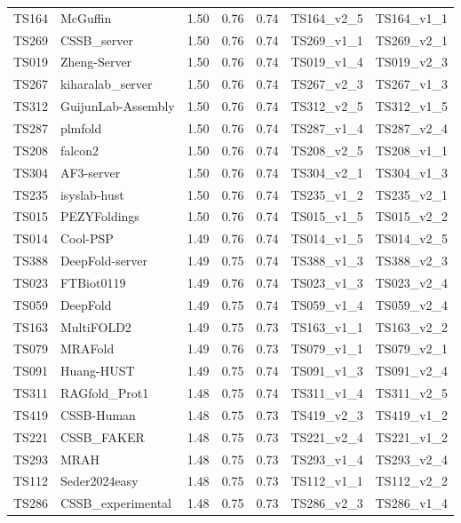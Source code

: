 \begin{longtable}{lllllll}
TS164 & McGuffin & 1.50 & 0.76 & 0.74 & TS164\_v2\_5 & TS164\_v1\_1 \\ 
TS269 & CSSB\_server & 1.50 & 0.76 & 0.74 & TS269\_v1\_1 & TS269\_v2\_1 \\ 
TS019 & Zheng-Server & 1.50 & 0.76 & 0.74 & TS019\_v1\_4 & TS019\_v2\_3 \\ 
TS267 & kiharalab\_server & 1.50 & 0.76 & 0.74 & TS267\_v2\_3 & TS267\_v1\_3 \\ 
TS312 & GuijunLab-Assembly & 1.50 & 0.76 & 0.74 & TS312\_v2\_5 & TS312\_v1\_5 \\ 
TS287 & plmfold & 1.50 & 0.76 & 0.74 & TS287\_v1\_4 & TS287\_v2\_4 \\ 
TS208 & falcon2 & 1.50 & 0.76 & 0.74 & TS208\_v2\_5 & TS208\_v1\_1 \\ 
TS304 & AF3-server & 1.50 & 0.76 & 0.74 & TS304\_v2\_1 & TS304\_v1\_3 \\ 
TS235 & isyslab-hust & 1.50 & 0.76 & 0.74 & TS235\_v1\_2 & TS235\_v2\_1 \\ 
TS015 & PEZYFoldings & 1.50 & 0.76 & 0.74 & TS015\_v1\_5 & TS015\_v2\_2 \\ 
TS014 & Cool-PSP & 1.49 & 0.76 & 0.74 & TS014\_v1\_5 & TS014\_v2\_5 \\ 
TS388 & DeepFold-server & 1.49 & 0.75 & 0.74 & TS388\_v1\_3 & TS388\_v2\_3 \\ 
TS023 & FTBiot0119 & 1.49 & 0.76 & 0.74 & TS023\_v1\_3 & TS023\_v2\_4 \\ 
TS059 & DeepFold & 1.49 & 0.75 & 0.74 & TS059\_v1\_4 & TS059\_v2\_4 \\ 
TS163 & MultiFOLD2 & 1.49 & 0.75 & 0.73 & TS163\_v1\_1 & TS163\_v2\_2 \\ 
TS079 & MRAFold & 1.49 & 0.76 & 0.73 & TS079\_v1\_1 & TS079\_v2\_1 \\ 
TS091 & Huang-HUST & 1.49 & 0.75 & 0.74 & TS091\_v1\_3 & TS091\_v2\_4 \\ 
TS311 & RAGfold\_Prot1 & 1.48 & 0.75 & 0.74 & TS311\_v1\_4 & TS311\_v2\_5 \\ 
TS419 & CSSB-Human & 1.48 & 0.75 & 0.73 & TS419\_v2\_3 & TS419\_v1\_2 \\ 
TS221 & CSSB\_FAKER & 1.48 & 0.75 & 0.73 & TS221\_v2\_4 & TS221\_v1\_2 \\ 
TS293 & MRAH & 1.48 & 0.75 & 0.73 & TS293\_v1\_4 & TS293\_v2\_4 \\ 
TS112 & Seder2024easy & 1.48 & 0.75 & 0.73 & TS112\_v1\_1 & TS112\_v2\_2 \\ 
TS286 & CSSB\_experimental & 1.48 & 0.75 & 0.73 & TS286\_v2\_3 & TS286\_v1\_4 \\ 

\end{longtable}

